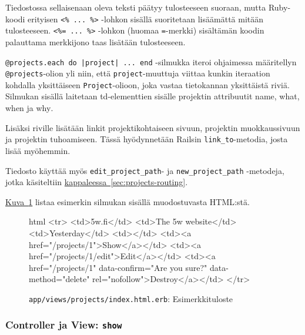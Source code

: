 \documentclass{article}
\newenvironment{myfigure}[1][tbp]{
  \begin{figure}[#1]
    \centering
    \begin{lrbox}{\myfigurebox}
      \begin{minipage}{\textwidth}
}{
      \end{minipage}
    \end{lrbox}
    \colorbox{blue!4}{\usebox{\myfigurebox}}
  \end{figure}
}
\newcommand{\myref}[2]{\hyperref[#2]{#1~\ref*{#2}}}
\newcommand{\pdfforeignlanguage}[2]{\texorpdfstring{\foreignlanguage{#1}{#2}}{#2}}
\newcommand{\eng}[1]{\pdfforeignlanguage{english}{#1}}
\begin{document}
Tiedostossa sellaisenaan oleva teksti päätyy tulosteeseen suoraan, mutta
Ruby-koodi erityisen \verb!<% ... %>! -lohkon sisällä suoritetaan lisäämättä
mitään tulosteeseen. \verb!<%= ... %>! -lohkon (huomaa \texttt{=}-merkki)
sisältämän koodin palauttama merkkijono taas lisätään tulosteeseen.

\verb!@projects.each do |project| ... end! -silmukka iteroi ohjaimessa
määritellyn \texttt{@projects}-olion yli niin, että \texttt{project}-muuttuja
viittaa kunkin iteraation kohdalla yksittäiseen \texttt{Project}-olioon, joka
vastaa tietokannan yksittäistä riviä. Silmukan sisällä laitetaan
td-elementtien sisälle projektin attribuutit \eng{name}, \eng{what}, \eng{when}
ja \eng{why}.

Lisäksi riville lisätään linkit projektikohtaiseen sivuun, projektin
muokkaussivuun ja projektin tuhoamiseen. Tässä hyödynnetään Railsin
\texttt{link\_to}-metodia, josta lisää myöhemmin.

Tiedosto käyttää myös \texttt{edit\_project\_path}- ja
\texttt{new\_project\_path} -metodeja, jotka käsiteltiin
\myref{kappaleessa}{sec:projects-routing}.

\begin{samepage}
\myref{Kuva}{fig:projects-index-view-00-example} listaa esimerkin silmukan
sisällä muodostuvasta HTML:stä.

\begin{myfigure}[H]
\caption{\texttt{app/views/projects/index.html.erb}: Esimerkkituloste}
\label{fig:projects-index-view-00-example}

\begin{pygmented}{html}
  <tr>
    <td>5w.fi</td>
    <td>The 5w website</td>
    <td>Yesterday</td>
    <td></td>
    <td><a href="/projects/1">Show</a></td>
    <td><a href="/projects/1/edit">Edit</a></td>
    <td><a href="/projects/1" data-confirm="Are you sure?" data-method="delete" rel="nofollow">Destroy</a></td>
  </tr>
\end{pygmented}
\end{myfigure}
\end{samepage}

\subsubsection{\eng{Controller} ja \eng{View}: \texttt{show}}
\end{document}
